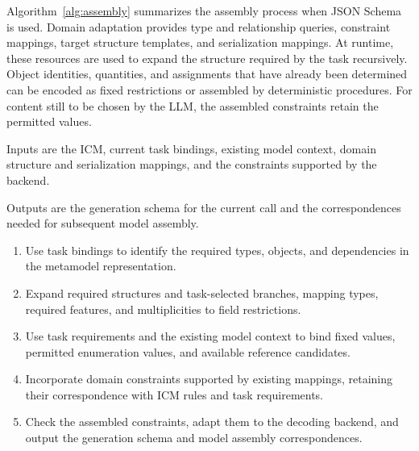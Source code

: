\documentclass[pdflatex,iicol,sn-mathphys-num]{sn-jnl}
\begin{document}
Algorithm~\ref{alg:assembly} summarizes the assembly process when JSON Schema is used. Domain adaptation provides type and relationship queries, constraint mappings, target structure templates, and serialization mappings. At runtime, these resources are used to expand the structure required by the task recursively. Object identities, quantities, and assignments that have already been determined can be encoded as fixed restrictions or assembled by deterministic procedures. For content still to be chosen by the LLM, the assembled constraints retain the permitted values.


\begin{algorithm}[!tbp]

\caption{Task-specific JSON Schema assembly}\label{alg:assembly}

\small

Inputs are the ICM, current task bindings, existing model context, domain structure and serialization mappings, and the constraints supported by the backend.\par

Outputs are the generation schema for the current call and the correspondences needed for subsequent model assembly.\par

\begin{enumerate}[leftmargin=1.7em,itemsep=2pt,topsep=4pt]

\item Use task bindings to identify the required types, objects, and dependencies in the metamodel representation.

\item Expand required structures and task-selected branches, mapping types, required features, and multiplicities to field restrictions.

\item Use task requirements and the existing model context to bind fixed values, permitted enumeration values, and available reference candidates.

\item Incorporate domain constraints supported by existing mappings, retaining their correspondence with ICM rules and task requirements.

\item Check the assembled constraints, adapt them to the decoding backend, and output the generation schema and model assembly correspondences.

\end{enumerate}

\end{algorithm}
\end{document}
